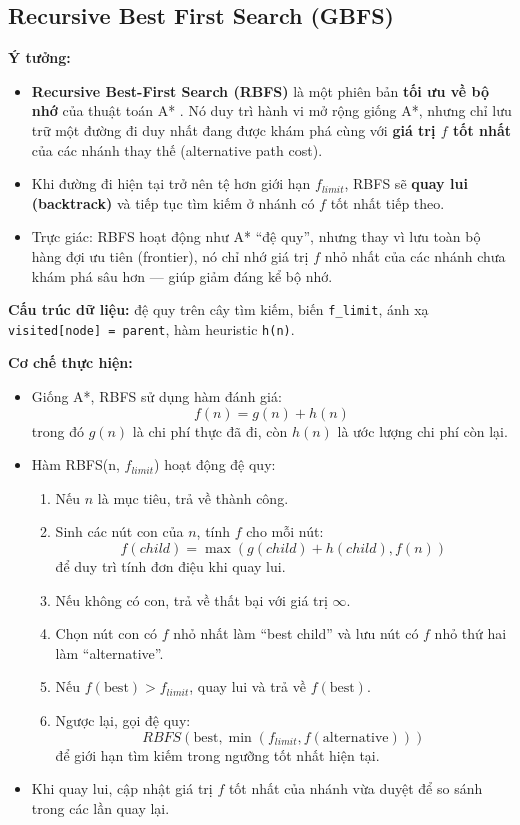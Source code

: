 \subsection{Recursive Best First Search (GBFS)}

\textbf{Ý tưởng:}
\begin{itemize}
    \item \textbf{Recursive Best-First Search (RBFS)} là một phiên bản \textbf{tối ưu về bộ nhớ} của thuật toán A* \cite{lecture2025}.  
    Nó duy trì hành vi mở rộng giống A*, nhưng chỉ lưu trữ một đường đi duy nhất đang được khám phá cùng với 
    \textbf{giá trị $f$ tốt nhất} của các nhánh thay thế (alternative path cost).
    \item Khi đường đi hiện tại trở nên tệ hơn giới hạn $f_{limit}$, RBFS sẽ \textbf{quay lui (backtrack)} 
    và tiếp tục tìm kiếm ở nhánh có $f$ tốt nhất tiếp theo.
    \item Trực giác: RBFS hoạt động như A* “đệ quy”, nhưng thay vì lưu toàn bộ hàng đợi ưu tiên (frontier), 
    nó chỉ nhớ giá trị $f$ nhỏ nhất của các nhánh chưa khám phá sâu hơn — giúp giảm đáng kể bộ nhớ.
\end{itemize}

\textbf{Cấu trúc dữ liệu:} 
đệ quy trên cây tìm kiếm, biến \texttt{f\_limit}, ánh xạ \texttt{visited[node] = parent}, hàm heuristic \texttt{h(n)}.

\textbf{Cơ chế thực hiện:}
\begin{itemize}
    \item Giống A*, RBFS sử dụng hàm đánh giá:
    \[
        f(n) = g(n) + h(n)
    \]
    trong đó $g(n)$ là chi phí thực đã đi, còn $h(n)$ là ước lượng chi phí còn lại.
    \item Hàm RBFS(n, $f_{limit}$) hoạt động đệ quy:
    \begin{enumerate}
        \item Nếu $n$ là mục tiêu, trả về thành công.
        \item Sinh các nút con của $n$, tính $f$ cho mỗi nút:
        \[
            f(child) = \max(g(child) + h(child), f(n))
        \]
        để duy trì tính đơn điệu khi quay lui.
        \item Nếu không có con, trả về thất bại với giá trị $\infty$.
        \item Chọn nút con có $f$ nhỏ nhất làm “best child” và lưu nút có $f$ nhỏ thứ hai làm “alternative”.
        \item Nếu $f(\text{best}) > f_{limit}$, quay lui và trả về $f(\text{best})$.
        \item Ngược lại, gọi đệ quy:
        \[
            RBFS(\text{best}, \min(f_{limit}, f(\text{alternative})))
        \]
        để giới hạn tìm kiếm trong ngưỡng tốt nhất hiện tại.
    \end{enumerate}
    \item Khi quay lui, cập nhật giá trị $f$ tốt nhất của nhánh vừa duyệt để so sánh trong các lần quay lại.
\end{itemize}

